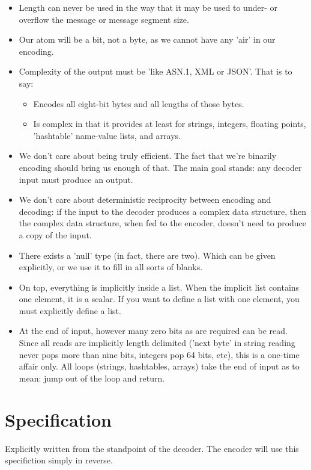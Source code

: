 \begin{itemize}
\item Length can never be used in the way that it may be used to 
  under- or overflow the message or message segment size.
\item Our atom will be a bit, not a byte, as we cannot have any 'air'
  in our encoding.
\item Complexity of the output must be 'like ASN.1, XML or JSON'.
  That is to say:
  \begin{itemize}
  \item Encodes all eight-bit bytes and all lengths of those bytes.
  \item Is complex in that it provides at least for strings, integers,
    floating points, 'hashtable' name-value lists, and arrays.
  \end{itemize}
\item We don't care about being truly efficient. The fact that we're
  binarily encoding should bring us enough of that. The main goal stands:
  any decoder input must produce an output.
\item We don't care about deterministic reciprocity between encoding
  and decoding: if the input to the decoder produces
  a complex data structure, then the complex data structure, when fed
  to the encoder, doesn't need to produce a copy of the input.
\item There exists a 'null' type (in fact, there are two).
  Which can be given explicitly, or
  we use it to fill in all sorts of blanks.
\item On top, everything is implicitly inside a list.
  When the implicit list contains
  one element, it is a scalar. If you want to define a list with
  one element, you must explicitly define a list.
\item At the end of input, however many zero bits as are required can be read.
  Since all reads are implicitly length delimited ('next byte' in string 
  reading never pops more than nine bits, integers pop 64 bits, etc),
  this is a one-time affair only. All loops (strings, hashtables, arrays)
  take the end of input as to mean: jump out of the loop and return.
\end{itemize}

\section{Specification}

Explicitly written from the standpoint of the decoder.
The encoder will use this specifiction simply in reverse.

